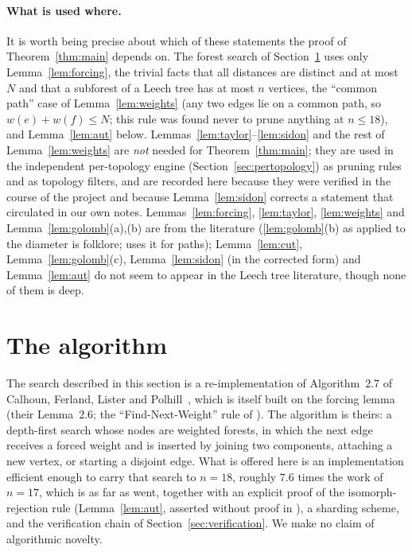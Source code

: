 \documentclass[11pt,a4paper]{article}
\theoremstyle{plain}
\theoremstyle{remark}
\begin{document}
\paragraph{What is used where.}
It is worth being precise about which of these statements the proof of
Theorem~\ref{thm:main} depends on.  The forest search of
Section~\ref{sec:algorithm} uses only Lemma~\ref{lem:forcing}, the trivial facts
that all distances are distinct and at most $N$ and that a subforest of a Leech
tree has at most $n$ vertices, the ``common path'' case of
Lemma~\ref{lem:weights} (any two edges lie on a common path, so $w(e)+w(f)\le N$;
this rule was found never to prune anything at $n\le 18$), and
Lemma~\ref{lem:aut} below.  Lemmas~\ref{lem:taylor}--\ref{lem:sidon} and the
rest of Lemma~\ref{lem:weights} are \emph{not} needed for Theorem~\ref{thm:main};
they are used in the independent per-topology engine
(Section~\ref{sec:pertopology}) as pruning rules and as topology filters, and are
recorded here because they were verified in the course of the project and
because Lemma~\ref{lem:sidon} corrects a statement that circulated in our own
notes.  Lemmas~\ref{lem:forcing}, \ref{lem:taylor}, \ref{lem:weights} and
Lemma~\ref{lem:golomb}(a),(b) are from the literature (\ref{lem:golomb}(b) as
applied to the diameter is folklore; \cite[Prop.~1.2]{Calhoun2007} uses it for
paths); Lemma~\ref{lem:cut}, Lemma~\ref{lem:golomb}(c), Lemma~\ref{lem:sidon}
(in the corrected form) and Lemma~\ref{lem:aut} do not seem to appear in the
Leech tree literature, though none of them is deep.

\section{The algorithm}\label{sec:algorithm}

The search described in this section is a re-implementation of Algorithm~2.7 of
Calhoun, Ferland, Lister and Polhill~\cite{Calhoun2007}, which is itself built on
the forcing lemma (their Lemma~2.6; the ``Find-Next-Weight'' rule of
\cite{SzekelyWangZhang2005}).  The algorithm is theirs: a depth-first search whose
nodes are weighted forests, in which the next edge receives a forced weight and is
inserted by joining two components, attaching a new vertex, or starting a disjoint
edge.  What is offered here is an implementation efficient enough to carry that
search to $n=18$, roughly $7.6$ times the work of $n=17$, which is as far as
\cite{Calhoun2007} went, together with an explicit proof of the isomorph-rejection
rule (Lemma~\ref{lem:aut}, asserted without proof in \cite{Calhoun2007}), a sharding
scheme, and the verification chain of Section~\ref{sec:verification}.  We make no
claim of algorithmic novelty.
\end{document}
